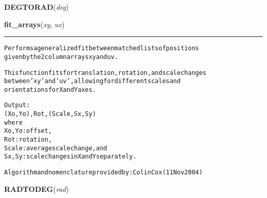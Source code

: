     \label{multireg:linearfit:DEGTORAD}
    \vspace{0.5ex}

    \begin{boxedminipage}{\textwidth}

    \raggedright \textbf{DEGTORAD}(\textit{deg})

    \end{boxedminipage}

    \label{multireg:linearfit:fit_arrays}
    \vspace{0.5ex}

    \begin{boxedminipage}{\textwidth}

    \raggedright \textbf{fit\_arrays}(\textit{xy}, \textit{uv})

    \vspace{-1.5ex}

    \rule{\textwidth}{0.5\fboxrule}
\begin{alltt}
Performs a generalized fit between matched lists of positions
given by the 2 column arrays xy and uv.

This function fits for translation, rotation, and scale changes
between 'xy' and 'uv', allowing for different scales and
orientations for X and Y axes.  

Output:
   (Xo,Yo),Rot,(Scale,Sx,Sy)
   where 
        Xo,Yo:  offset, 
        Rot:    rotation,
        Scale:  average scale change, and 
        Sx,Sy:  scale changes in X and Y separately.

Algorithm and nomenclature provided by: Colin Cox (11 Nov 2004)\end{alltt}

    \vspace{1ex}

    \end{boxedminipage}

    \label{multireg:linearfit:RADTODEG}
    \vspace{0.5ex}

    \begin{boxedminipage}{\textwidth}

    \raggedright \textbf{RADTODEG}(\textit{rad})

    \end{boxedminipage}

